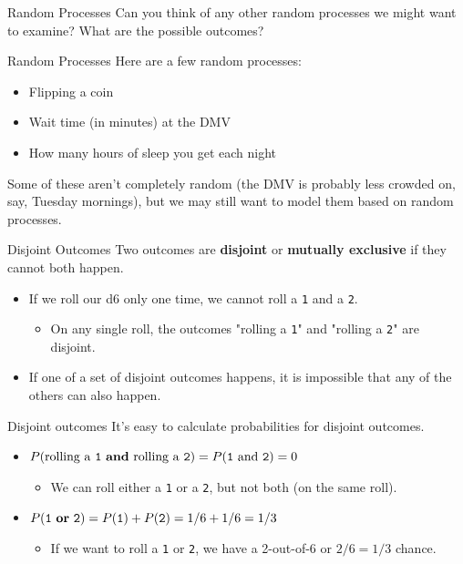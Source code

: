 \begin{frame}{Random Processes}
    Can you think of any other random processes we might want to examine? What are the possible outcomes?
\end{frame}

\begin{frame}{Random Processes}
    Here are a few random processes:
    \begin{itemize}
        \item Flipping a coin
        \item Wait time (in minutes) at the DMV
        \item How many hours of sleep you get each night
    \end{itemize}
    Some of these aren't completely random (the DMV is probably less crowded on, say, Tuesday mornings), but we may still want to model them based on random processes.
\end{frame}

\begin{frame}{Disjoint Outcomes}
    Two outcomes are \textbf{disjoint} or \textbf{mutually exclusive} if they cannot both happen.
    \begin{itemize}
        \item If we roll our d6 only one time, we cannot roll a \texttt{1} and a \texttt{2}. 
        \begin{itemize}
            \item On any single roll, the outcomes "rolling a \texttt{1}" and "rolling a \texttt{2}" are disjoint.
        \end{itemize}
        \item If one of a set of disjoint outcomes happens, it is impossible that any of the others can also happen.
    \end{itemize}
\end{frame}

\begin{frame}{Disjoint outcomes}
    It's easy to calculate probabilities for disjoint outcomes.
    
    \vspace{12pt}
    \begin{itemize}
        \item $P(\text{rolling a \texttt{1} \textbf{and} rolling a \texttt{2}}) = P(\text{\texttt{1} and \texttt{2}}) = 0$
        \begin{itemize}
            \item We can roll either a \texttt{1} or a \texttt{2}, but not both (on the same roll).
        \end{itemize}
        \item $P(\text{\texttt{1} \textbf{or} \texttt{2}}) = P(\text{\texttt{1}}) + P(\text{\texttt{2}}) = 1/6 + 1/6 = 1/3$
        \begin{itemize}
            \item If we want to roll a \texttt{1} or \texttt{2}, we have a 2-out-of-6 or $2/6=1/3$ chance.
        \end{itemize}
    \end{itemize}
\end{frame}

